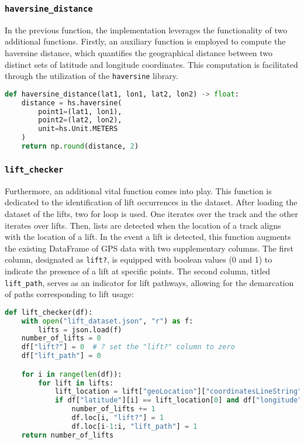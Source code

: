 \subsubsection{\texttt{haversine\_distance}}

In the previous function, the implementation leverages the functionality of two additional functions. Firstly, an auxiliary function is employed to compute the haversine distance, which quantifies the geographical distance between two distinct sets of latitude and longitude coordinates. This computation is facilitated through the utilization of the \texttt{haversine} library. 

\begin{lstlisting}[language=Python]
def haversine_distance(lat1, lon1, lat2, lon2) -> float:
    distance = hs.haversine(
        point1=(lat1, lon1),
        point2=(lat2, lon2),
        unit=hs.Unit.METERS
    )
    return np.round(distance, 2)
\end{lstlisting}

\subsubsection{\texttt{lift\_checker}}

Furthermore, an additional vital function comes into play. This function is dedicated to the identification of 
lift occurrences in the dataset. After loading the dataset of the lifts, two for loop is used. 
One iterates over the track and the other iterates over lifts. Then, lists are detected when the location of a track aligns with the location of a lift.
In the event a lift is detected, this function augments the existing DataFrame of 
GPS data with two supplementary columns. The first column, designated as \texttt{lift?}, 
is equipped with boolean values (0 and 1) to indicate the presence of a lift at specific points. 
The second column, titled \texttt{lift\_path}, serves as an indicator for lift pathways, 
allowing for the demarcation of paths corresponding to lift usage:

\begin{lstlisting}[language=Python]
def lift_checker(df):
    with open("lift_dataset.json", "r") as f:
        lifts = json.load(f)
    number_of_lifts = 0
    df["lift?"] = 0  # ? set the "lift?" column to zero
    df["lift_path"] = 0

    for i in range(len(df)):
        for lift in lifts:
            lift_location = lift["geoLocation"]["coordinatesLineString"]
            if df["latitude"][i] == lift_location[0] and df["longitude"][i] == lift_location[1]:
                number_of_lifts += 1
                df.loc[i, "lift?"] = 1
                df.loc[i-1:i, "lift_path"] = 1
    return number_of_lifts
\end{lstlisting}

